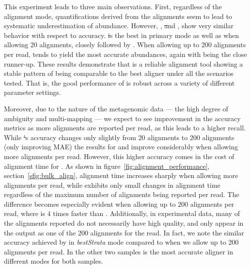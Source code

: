 This experiment leads to three main observations. First, regardless of
the alignment mode, quantifications derived from the \debga alignments seem 
to lead to systematic underestimation of abundance.
However, \puffaligner, \st and \bt, show very similar behavior with respect to accuracy. 
\st is the best in primary mode as well as when allowing 20 alignments, closely followed by 
\puffaligner.  When allowing up to 200 alignments per read, \bt tends to yield the most accurate 
abundances, again with \puffaligner being the close runner-up. 
These results demonstrate that \puffaligner is a reliable alignment tool 
showing a stable pattern of being comparable to the best aligner under all 
the scenarios tested.  That is, the good performance of \puffaligner is robust across
a variety of different parameter settings.

Moreover, due to the nature of the metagenomic data --- the high degree of
ambiguity and multi-mapping --- we expect to see improvement in the
accuracy metrics as more alignments are reported per read, as this
leads to a higher recall. While \st's accuracy changes only slightly from
20 alignments to 200 alignments (only improving MAE) the results for
\puffaligner and \bt improve considerably when allowing more alignments per
read. However, this higher accuracy comes in the cost of alignment time
for \bt. As shown in figure~\ref{fig:alignment_performance},
section~\ref{sfig:bulk_align}, \bt alignment time increases sharply when allowing more
alignments per read, while \puffaligner exhibits only small changes in alignment time 
regardless of the maximum number of alignments being reported per read. 
The difference becomes especially evident when allowing up to 200 alignments per read, 
where \puffaligner is $4$ times faster than \bt. Additionally, in experimental data, many
of the alignments reported do not necessarily have high quality, and
only appear in the output as one of the 200 alignments for the read. 
In fact, we note the similar accuracy
achieved by \puffaligner in \textit{bestStrata} mode compared to 
when we allow up to 200 alignments per read. In the other two samples
\puffaligner is the most accurate aligner in different modes for both samples.

